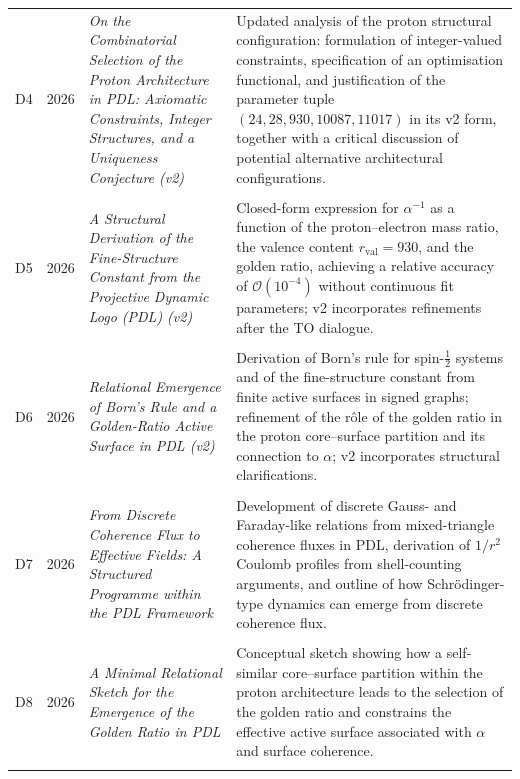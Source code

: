 \documentclass[11pt,a4paper]{article}
\begin{document}
\begin{longtable}{@{}llL{4cm}p{9.0cm}@{}}
D4 & 2026 & \textit{On the Combinatorial Selection of the Proton Architecture in PDL: Axiomatic Constraints, Integer Structures, and a Uniqueness Conjecture (v2)} &
Updated analysis of the proton structural configuration: formulation of integer-valued constraints, specification of an optimisation functional, and justification of the parameter tuple $(24,28,930,10087,11017)$ in its v2 form, together with a critical discussion of potential alternative architectural configurations. \citep{Combinatorial_Proton_v2_2026} \\\\[0.5em]

D5 & 2026 & \textit{A Structural Derivation of the Fine-Structure Constant from the Projective Dynamic Logo (PDL) (v2)} &
Closed-form expression for $\alpha^{-1}$ as a function of the proton–electron mass ratio, the valence content $r_{\mathrm{val}}=930$, and the golden ratio, achieving a relative accuracy of $\mathcal{O}(10^{-4})$ without continuous fit parameters; v2 incorporates refinements after the TO dialogue. \citep{Alpha_PDL_v2_2026} \\\\[0.5em]

D6 & 2026 & \textit{Relational Emergence of Born's Rule and a Golden-Ratio Active Surface in PDL (v2)} &
Derivation of Born's rule for spin-$\tfrac{1}{2}$ systems and of the fine-structure constant from finite active surfaces in signed graphs; refinement of the rôle of the golden ratio in the proton core–surface partition and its connection to $\alpha$; v2 incorporates structural clarifications. \citep{Born_Golden_v2_2026,Golden_Ratio_Sketch_2026} \\\\[0.5em]

D7 & 2026 & \textit{From Discrete Coherence Flux to Effective Fields: A Structured Programme within the PDL Framework} &
Development of discrete Gauss- and Faraday-like relations from mixed-triangle coherence fluxes in PDL, derivation of $1/r^2$ Coulomb profiles from shell-counting arguments, and outline of how Schr\"odinger-type dynamics can emerge from discrete coherence flux. \citep{Effective_Fields_PDL_2026} \\\\[0.5em]

D8 & 2026 & \textit{A Minimal Relational Sketch for the Emergence of the Golden Ratio in PDL} &
Conceptual sketch showing how a self-similar core–surface partition within the proton architecture leads to the selection of the golden ratio and constrains the effective active surface associated with $\alpha$ and surface coherence. \citep{Golden_Ratio_Sketch_2026} \\\\[0.5em]


\end{longtable}
\end{document}
